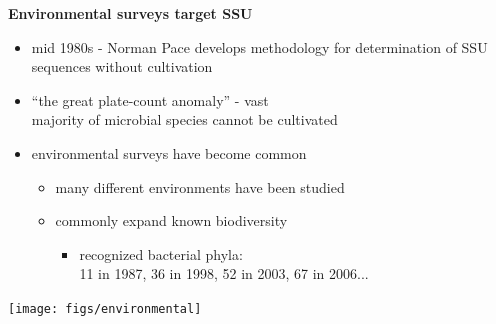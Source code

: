 \documentclass[landscape]{slides}
\begin{document}
\begin{slide}
\begin{center}

\textbf{Environmental surveys target SSU}
\end{center}
\medskip
\begin{minipage}{7in}
\small
\begin{itemize}
\item
mid 1980s - Norman Pace develops methodology for determination of SSU
sequences without cultivation
\item
``the great plate-count anomaly'' - vast \\ majority of microbial species
  cannot be cultivated
\item
environmental surveys have become common
\begin{itemize}
  \item
    many different environments have been studied
  \item
    commonly expand known biodiversity
    \begin{itemize}
      \item
	recognized bacterial phyla: \\
	11 in 1987, 36 in 1998, 52 in 2003, 67 in 2006...
    \end{itemize}
\end{itemize}
\end{itemize}

\vspace{.7in}
\end{minipage}
\hspace{0.1in}
\begin{minipage}{3in}
\texttt{[image: figs/environmental]}
\vspace{1in}
\end{minipage}
\end{slide}
\end{document}

